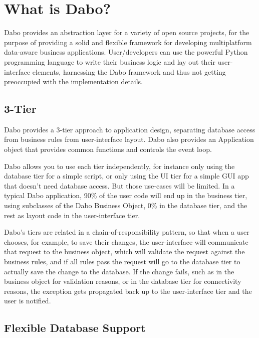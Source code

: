 
\chapter{What is Dabo?}

Dabo provides an abstraction layer for a variety of open source projects, for the 
purpose of providing a solid and flexible framework for developing multiplatform 
data-aware business applications. User/developers can use the powerful Python 
programming language to write their business logic and lay out their user-interface 
elements, harnessing the Dabo framework and thus not getting preoccupied with the 
implementation details.

\section{3-Tier}

Dabo provides a 3-tier approach to application design, separating database access 
from business rules from user-interface layout. Dabo also provides an Application 
object that provides common functions and controls the event loop.

Dabo allows you to use each tier independently, for instance only using the database 
tier for a simple script, or only using the UI tier for a simple GUI app that doesn't 
need database access. But those use-cases will be limited. In a typical Dabo 
application, 90\% of the user code will end up in the business tier, using subclasses 
of the Dabo Business Object, 0\% in the database tier, and the rest as layout code 
in the user-interface tier.

Dabo's tiers are related in a chain-of-responsibility pattern, so that when a user 
chooses, for example, to save their changes, the user-interface will communicate 
that request to the business object, which will validate the request against the 
business rules, and if all rules pass the request will go to the database tier to 
actually save the change to the database. If the change fails, such as in the 
business object for validation reasons, or in the database tier for connectivity 
reasons, the exception gets propagated back up to the user-interface tier and the 
user is notified.

\section{Flexible Database Support}

